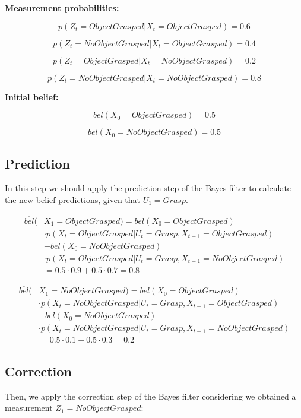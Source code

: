 \documentclass{article}
\begin{document}
\textbf{Measurement probabilities:}

\[
p(Z_t=ObjectGrasped|X_t=ObjectGrasped) = 0.6
\]

\[
p(Z_t=NoObjectGrasped|X_t=ObjectGrasped) = 0.4
\]

\[
p(Z_t=ObjectGrasped|X_t=NoObjectGrasped) = 0.2
\]

\[
p(Z_t=NoObjectGrasped|X_t=NoObjectGrasped) = 0.8
\]

\textbf{Initial belief:}

\[
bel(X_0=ObjectGrasped) = 0.5
\]

\[
bel(X_0=NoObjectGrasped) = 0.5
\]

\subsection{Prediction}

In this step we should apply the prediction step of the Bayes filter to calculate the new belief predictions, given that $U_1=Grasp$.


\begin{align*}
\overline{bel}(&X_1=ObjectGrasped) = bel(X_0=ObjectGrasped) \\
			&\cdot p(X_t=ObjectGrasped|U_t=Grasp, X_{t-1}=ObjectGrasped) \\
			&+ bel(X_0=NoObjectGrasped) \\
			&\cdot p(X_t=ObjectGrasped|U_t=Grasp, X_{t-1}=NoObjectGrasped)\\
			&=0.5 \cdot 0.9 + 0.5 \cdot 0.7 = 0.8
\end{align*}

\begin{align*}
\overline{bel}(&X_1=NoObjectGrasped) = bel(X_0=ObjectGrasped) \\
			&\cdot p(X_t=NoObjectGrasped|U_t=Grasp, X_{t-1}=ObjectGrasped) \\
			&+ bel(X_0=NoObjectGrasped) \\
			&\cdot p(X_t=NoObjectGrasped|U_t=Grasp, X_{t-1}=NoObjectGrasped)\\
			&=0.5 \cdot 0.1 + 0.5 \cdot 0.3 = 0.2
\end{align*}


\subsection{Correction}

Then, we apply the correction step of the Bayes filter considering we obtained a measurement $Z_1=NoObjectGrasped$:
\end{document}
